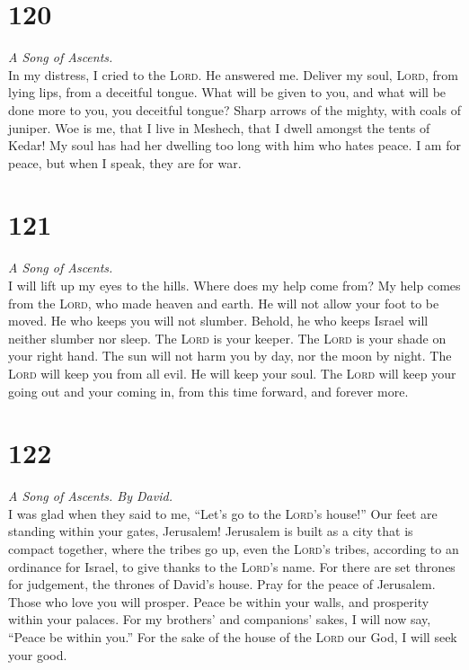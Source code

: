 \hypertarget{section-119}{%
\section{120}\label{section-119}}

\emph{A Song of Ascents.}\\
 In my distress, I cried to the \textsc{Lord}. He answered
me.  Deliver my soul, \textsc{Lord}, from lying lips, from
a deceitful tongue.  What will be given to you, and what
will be done more to you, you deceitful tongue?  Sharp
arrows of the mighty, with coals of juniper.  Woe is me,
that I live in Meshech, that I dwell amongst the tents of Kedar!
 My soul has had her dwelling too long with him who hates
peace.  I am for peace, but when I speak, they are for
war.

\hypertarget{section-120}{%
\section{121}\label{section-120}}

\emph{A Song of Ascents.}\\
 I will lift up my eyes to the hills. Where does my help
come from?  My help comes from the \textsc{Lord}, who made
heaven and earth.  He will not allow your foot to be
moved. He who keeps you will not slumber.  Behold, he who
keeps Israel will neither slumber nor sleep.  The
\textsc{Lord} is your keeper. The \textsc{Lord} is your shade on your
right hand.  The sun will not harm you by day, nor the
moon by night.  The \textsc{Lord} will keep you from all
evil. He will keep your soul.  The \textsc{Lord} will keep
your going out and your coming in, from this time forward, and forever
more.

\hypertarget{section-121}{%
\section{122}\label{section-121}}

\emph{A Song of Ascents. By David.}\\
 I was glad when they said to me, ``Let's go to the
\textsc{Lord}'s house!''  Our feet are standing within
your gates, Jerusalem!  Jerusalem is built as a city that
is compact together,  where the tribes go up, even the
\textsc{Lord}'s tribes, according to an ordinance for Israel, to give
thanks to the \textsc{Lord}'s name.  For there are set
thrones for judgement, the thrones of David's house.  Pray
for the peace of Jerusalem. Those who love you will prosper.
 Peace be within your walls, and prosperity within your
palaces.  For my brothers' and companions' sakes, I will
now say, ``Peace be within you.''  For the sake of the
house of the \textsc{Lord} our God, I will seek your good.

